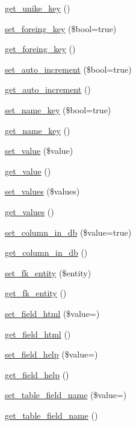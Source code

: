 \begin{DoxyCompactItemize}
\item 
\mbox{\hyperlink{class_column_adc97cb771ea70684dcb2ff4591880418}{get\+\_\+unike\+\_\+key}} ()
\item 
\mbox{\hyperlink{class_column_a5ec7cacb0cd684328df7e04a9bf1e891}{set\+\_\+foreing\+\_\+key}} (\$bool=true)
\item 
\mbox{\hyperlink{class_column_a43e6f982df392a8497bce9869142e66c}{get\+\_\+foreing\+\_\+key}} ()
\item 
\mbox{\hyperlink{class_column_a32c16aaa4042527777de5b48754c3fbd}{set\+\_\+auto\+\_\+increment}} (\$bool=true)
\item 
\mbox{\hyperlink{class_column_ac3da460a7c41cfc906f2ea3e8b37280f}{get\+\_\+auto\+\_\+increment}} ()
\item 
\mbox{\hyperlink{class_column_a8ecb11e158dea1d54dd042c593e96f0e}{set\+\_\+name\+\_\+key}} (\$bool=true)
\item 
\mbox{\hyperlink{class_column_afbe92323031606a80891038f2a833e37}{get\+\_\+name\+\_\+key}} ()
\item 
\mbox{\hyperlink{class_column_a156be29aa2b09b0685b54e4eb273e98f}{set\+\_\+value}} (\$value)
\item 
\mbox{\hyperlink{class_column_a16ae34425bea11e5f6435f2a8987a798}{get\+\_\+value}} ()
\item 
\mbox{\hyperlink{class_column_ae867869393b7a30d7a41490497544c81}{set\+\_\+values}} (\$values)
\item 
\mbox{\hyperlink{class_column_a58db8b06f4c93ec071a51a1f76009052}{get\+\_\+values}} ()
\item 
\mbox{\hyperlink{class_column_af7dbe1ffea3921f6af03c05ca057e7f2}{set\+\_\+column\+\_\+in\+\_\+db}} (\$value=true)
\item 
\mbox{\hyperlink{class_column_ac730ad2d5ffed1e805200bf0cdc15064}{get\+\_\+column\+\_\+in\+\_\+db}} ()
\item 
\mbox{\hyperlink{class_column_ac98ea0f2cf873e1169d470b6b8aed87e}{set\+\_\+fk\+\_\+entity}} (\$entity)
\item 
\mbox{\hyperlink{class_column_ac8077334a5b99bee2ff2d63f211373cc}{get\+\_\+fk\+\_\+entity}} ()
\item 
\mbox{\hyperlink{class_column_a5437315051a5e96842582d3668554245}{set\+\_\+field\+\_\+html}} (\$value=\textquotesingle{}\textquotesingle{})
\item 
\mbox{\hyperlink{class_column_aac0bf1664721d84626a1fc9eca321488}{get\+\_\+field\+\_\+html}} ()
\item 
\mbox{\hyperlink{class_column_ad21200d7ae8693427a38e51c100badf6}{set\+\_\+field\+\_\+help}} (\$value=\textquotesingle{}\textquotesingle{})
\item 
\mbox{\hyperlink{class_column_a1fe455614c5937aec57db013d23df078}{get\+\_\+field\+\_\+help}} ()
\item 
\mbox{\hyperlink{class_column_a314eeaf954a8c2607626f9c742a9f579}{set\+\_\+table\+\_\+field\+\_\+name}} (\$value=\textquotesingle{}\textquotesingle{})
\item 
\mbox{\hyperlink{class_column_a9322fc30623d22ff4023413a43250689}{get\+\_\+table\+\_\+field\+\_\+name}} ()
\end{DoxyCompactItemize}
